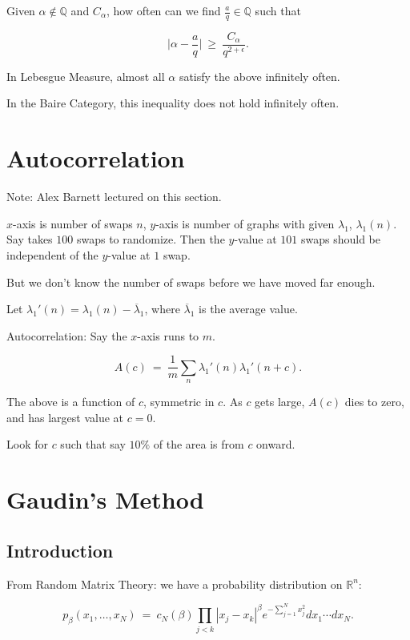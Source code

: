 \documentclass[12pt,letterpaper]{report}
\newcommand\be{\begin{equation}}
\newcommand\ee{\end{equation}}
\newcommand{\R}{\ensuremath{\mathbb{R}}}
\newcommand{\Q}{\mathbb{Q}}
\begin{document}
Given $\alpha \not\in \Q$ and $C_\alpha$, how often can we find
$\frac{a}{q} \in \Q$ such that

\be \Big| \alpha - \frac{a}{q} \Big| \ \ge \ \frac{C_\alpha}{q^{2
+ \epsilon} }. \ee

In Lebesgue Measure, almost all $\alpha$ satisfy the above
infinitely often.

In the Baire Category, this inequality does not hold infinitely
often.



\section{Autocorrelation}

Note: Alex Barnett lectured on this section.

$x$-axis is number of swaps $n$, $y$-axis is number of graphs with
given $\lambda_1$, $\lambda_1(n)$. Say takes $100$ swaps to
randomize. Then the $y$-value at $101$ swaps should be independent
of the $y$-value at $1$ swap.

But we don't know the number of swaps before we have moved far
enough.

Let $\lambda_1'(n) = \lambda_1(n) - \overline{\lambda}_1$, where
$\overline{\lambda}_1$ is the average value.

Autocorrelation: Say the $x$-axis runs to $m$.

\be A(c) \ = \ \frac{1}{m}\sum_n \lambda_1'(n) \lambda_1'(n+c).
\ee

The above is a function of $c$, symmetric in $c$. As $c$ gets
large, $A(c)$ dies to zero, and has largest value at $c = 0$.

Look for $c$ such that say $10\%$ of the area is from $c$ onward.



\section{Gaudin's Method}

\subsection{Introduction}

From Random Matrix Theory: we have a probability distribution on
$\R^n$:

\be p_\beta(x_1,\dots,x_N) \ = \ c_N(\beta) \prod_{j<k} |x_j -
x_k|^\beta e^{-\sum_{j=1}^N x_j^2} dx_1\cdots dx_N. \ee
\end{document}
